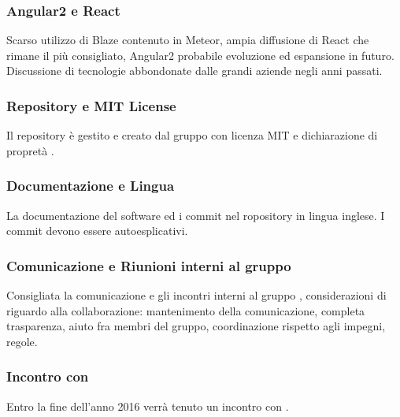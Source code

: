 \subsubsection{Angular2 e React}
Scarso utilizzo di Blaze contenuto in Meteor, ampia diffusione di React che rimane il più consigliato, Angular2 probabile evoluzione ed espansione in futuro.
Discussione di tecnologie abbondonate dalle grandi aziende negli anni passati.

\subsubsection{Repository e MIT License}
Il repository è gestito e creato dal gruppo \GroupName con licenza MIT e dichiarazione di propretà \Proponente.

\subsubsection{Documentazione e Lingua}
La documentazione del software ed i commit nel ropository in lingua inglese. I commit devono essere autoesplicativi.

\subsubsection{Comunicazione e Riunioni interni al gruppo \GroupName}
Consigliata la comunicazione e gli incontri interni al gruppo \GroupName, considerazioni di \Proponente riguardo alla collaborazione: mantenimento della comunicazione, completa trasparenza, aiuto fra membri del gruppo, coordinazione rispetto agli impegni, regole. 

\subsubsection{Incontro con \Proponente}
Entro la fine dell'anno 2016 verrà tenuto un incontro con \Proponente.

\clearpage

